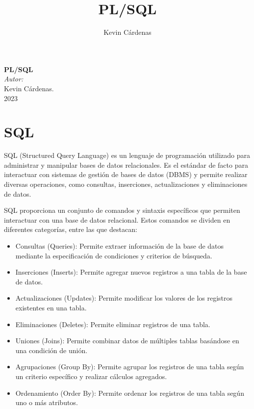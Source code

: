 \documentclass[executivepaper]{article}
\title{PL/SQL}
\author{Kevin Cárdenas}
\begin{document}
\begin{titlepage}
    \begin{center}
        {\Huge \textbf{PL/SQL}}
        \\[18cm]

        \large\emph{Autor:}\\
        Kevin Cárdenas.
        \\[1cm]
        {\large 2023}
    \end{center}
\end{titlepage}
\newpage
\tableofcontents
\newpage

\section{SQL}

SQL (Structured Query Language) es un lenguaje de programación utilizado para administrar y manipular bases de datos relacionales. Es el estándar de facto para interactuar con sistemas de gestión de bases de datos (DBMS) y permite realizar diversas operaciones, como consultas, inserciones, actualizaciones y eliminaciones de datos.

SQL proporciona un conjunto de comandos y sintaxis específicos que permiten interactuar con una base de datos relacional. Estos comandos se dividen en diferentes categorías, entre las que destacan:

\begin{itemize}
\item Consultas (Queries): Permite extraer información de la base de datos mediante la especificación de condiciones y criterios de búsqueda.
\item Inserciones (Inserts): Permite agregar nuevos registros a una tabla de la base de datos.
\item Actualizaciones (Updates): Permite modificar los valores de los registros existentes en una tabla.
\item Eliminaciones (Deletes): Permite eliminar registros de una tabla.
\item Uniones (Joins): Permite combinar datos de múltiples tablas basándose en una condición de unión.
\item Agrupaciones (Group By): Permite agrupar los registros de una tabla según un criterio específico y realizar cálculos agregados.
\item Ordenamiento (Order By): Permite ordenar los registros de una tabla según uno o más atributos.
\end{itemize}
\end{document}
